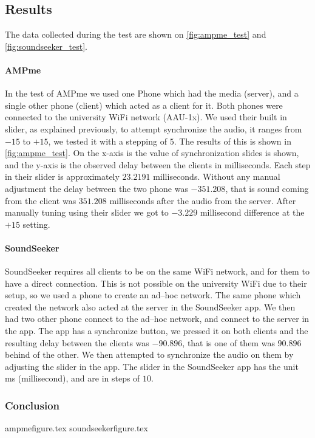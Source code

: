 \subsection{Results}
The data collected during the test are shown on \cref{fig:ampme_test} and \cref{fig:soundseeker_test}.

\paragraph{AMPme}
In the test of AMPme we used one Phone which had the media (server), and a single other phone (client) which acted as a client for it. 
Both phones were connected to the university WiFi network (AAU-1x).
We used their built in slider, as explained previously, to attempt synchronize the audio, it ranges from $-15$ to $+15$, we tested it with a stepping of $5$. 
The results of this is shown in \cref{fig:ampme_test}.
On the x-axis is the value of synchronization slides is shown, and the y-axis is the observed delay between the clients in milliseconds.
Each step in their slider is approximately $23.2191$ milliseconds.
Without any manual adjustment the delay between the two phone was $-351.208$, that is sound coming from the client was $351.208$ milliseconds after the audio from the server. 
After manually tuning using their slider we got to $-3.229$ millisecond difference at the $+15$ setting.  

\paragraph{SoundSeeker}
SoundSeeker requires all clients to be on the same WiFi network, and for them to have a direct connection. 
This is not possible on the university WiFi due to their setup, so we used a phone to create an ad--hoc network. 
The same phone which created the network also acted at the server in the SoundSeeker app. 
We then had two other phone connect to the ad--hoc network, and connect to the server in the app.
The app has a synchronize button, we pressed it on both clients and the resulting delay between the clients was $-90.896$, that is one of them was $90.896$ behind of the other. 
We then attempted to synchronize the audio on them by adjusting the slider in the app.
The slider in the SoundSeeker app has the unit ms (millisecond), and are in steps of $10$.  

\subsubsection*{Conclusion}

{ampmefigure.tex}
{soundseekerfigure.tex}
